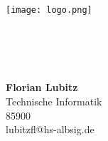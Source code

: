 \begin{titlepage}

\begin{center}
\texttt{[image: logo.png]}\\[5ex]


\large{\betreff}\\[3.5ex]

\LARGE{\textbf{\titel}}\\[1.5ex]
\large{\untertitel}\\[3.5ex]

\normalsize

\begin{tabular}{c}

\end{tabular}

\textbf{\Large{Florian Lubitz}}\\
Technische Informatik\\
85900\\
lubitzfl@hs-albsig.de
\\[3ex]

\end{center}

\end{titlepage}